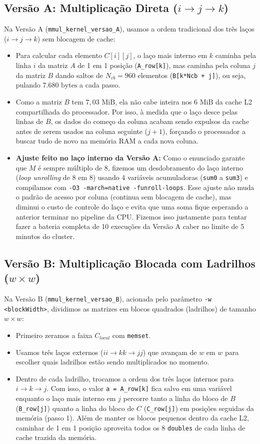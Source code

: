 \documentclass[12pt, a4paper, twoside, chapter=TITLE, subsection=TITLE, section=TITLE, subsubsection=TITLE, english, brazil]{abntex2}
\begin{document}
\subsection{Versão A: Multiplicação Direta ($i \to j \to k$)}
Na Versão A (\nolinkurl{mmul_kernel_versao_A}), usamos a ordem tradicional dos três laços ($i \to j \to k$) sem blocagem de cache:
\begin{itemize}
    \item Para calcular cada elemento $C[i][j]$, o laço mais interno em $k$ caminha pela linha $i$ da matriz $A$ de 1 em 1 posição (\texttt{A\_row[k]}), mas caminha pela coluna $j$ da matriz $B$ dando saltos de $N_{cb} = 960$ elementos (\texttt{B[k*Ncb + j]}), ou seja, pulando $7.680\text{ bytes}$ a cada passo.
    \item Como a matriz $B$ tem $7,03\text{ MiB}$, ela não cabe inteira nos $6\text{ MiB}$ da cache L2 compartilhada do processador. Por isso, à medida que o laço desce pelas linhas de $B$, os dados do começo da coluna acabam sendo expulsos da cache antes de serem usados na coluna seguinte ($j+1$), forçando o processador a buscar tudo de novo na memória RAM a cada nova coluna.
    \item \textbf{Ajuste feito no laço interno da Versão A:} Como o enunciado garante que $M$ é sempre múltiplo de 8, fizemos um desdobramento do laço interno (\textit{loop unrolling} de 8 em 8) usando 4 variáveis acumuladoras (\texttt{sum0} a \texttt{sum3}) e compilamos com \texttt{-O3 -march=native -funroll-loops}. Esse ajuste não muda o padrão de acesso por coluna (continua sem blocagem de cache), mas diminui o custo de controle do laço e evita que uma soma fique esperando a anterior terminar no pipeline da CPU. Fizemos isso justamente para tentar fazer a bateria completa de 10 execuções da Versão A caber no limite de 5 minutos do cluster.
\end{itemize}

\subsection{Versão B: Multiplicação Blocada com Ladrilhos ($w \times w$)}
Na Versão B (\nolinkurl{mmul_kernel_versao_B}), acionada pelo parâmetro \texttt{-w <blockWidth>}, dividimos as matrizes em blocos quadrados (ladrilhos) de tamanho $w \times w$:
\begin{itemize}
    \item Primeiro zeramos a faixa $C_{local}$ com \texttt{memset}.
    \item Usamos três laços externos ($ii \to kk \to jj$) que avançam de $w$ em $w$ para escolher quais ladrilhos estão sendo multiplicados no momento.
    \item Dentro de cada ladrilho, trocamos a ordem dos três laços internos para $i \to k \to j$. Com isso, o valor \texttt{a = A\_row[k]} fica salvo em uma variável enquanto o laço mais interno em $j$ percorre tanto a linha do bloco de $B$ (\texttt{B\_row[j]}) quanto a linha do bloco de $C$ (\texttt{C\_row[j]}) em posições seguidas da memória (passo 1). Além de manter os blocos pequenos dentro da cache L2, caminhar de 1 em 1 posição aproveita todos os 8 \texttt{doubles} de cada linha de cache trazida da memória.
\end{itemize}
\end{document}

